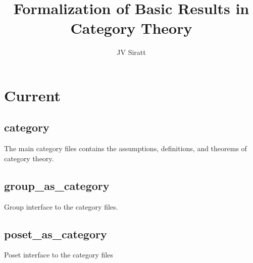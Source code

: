 \documentclass[11pt]{article}
\title{Formalization of Basic Results in Category Theory}
\author{JV Siratt}
\begin{document}
\maketitle

\section{Current}

\subsection{category}

The main category files contains the assumptions, definitions, and theorems of category theory.

\subsection{group\_as\_category}

Group interface to the category files.

\subsection{poset\_as\_category}

Poset interface to the category files
\end{document}
